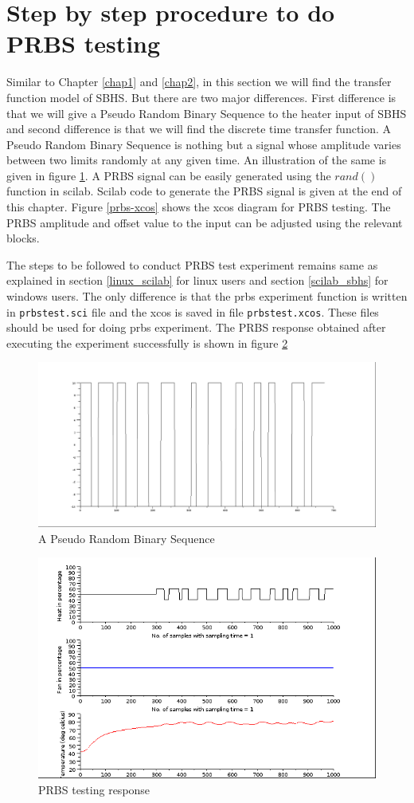 \section{Step by step procedure to do PRBS testing}

Similar to Chapter \ref{chap1} and \ref{chap2}, in this section we will find the transfer function model of SBHS. But there are two major differences. First difference is that we will give a Pseudo Random Binary Sequence to the heater input of SBHS and second difference is that we will find the discrete time transfer function. A Pseudo Random Binary Sequence is nothing but a signal whose amplitude varies between two limits randomly at any given time. An illustration of the same is given in figure \ref{prbs-fig}. A PRBS signal can be easily generated using the $rand()$ function in scilab. Scilab code to generate the PRBS signal is given at the end of this chapter. Figure \ref{prbs-xcos} shows the xcos diagram for PRBS testing. The PRBS amplitude and offset value to the input can be adjusted using the relevant blocks. 

The steps to be followed to conduct PRBS test experiment remains same as explained in section \ref{linux_scilab} for linux users and section \ref{scilab_sbhs} for windows users. The only difference is that the prbs experiment function is written in {\tt prbstest.sci} file and the xcos is saved in file {\tt prbstest.xcos}. These files should be used for doing prbs experiment. The PRBS response obtained after executing the experiment successfully is shown in figure \ref{prbs-res}
\begin{figure}
\centering
\includegraphics[width=0.7\linewidth]{prbs/prbs-illustration.png}
\caption{A Pseudo Random Binary Sequence}
\label{prbs-fig}
\end{figure}

\begin{figure}
\centering
\includegraphics[width=0.7\linewidth]{prbs/prbs-expt.png}
\caption{PRBS testing response}
\label{prbs-res}
\end{figure}


